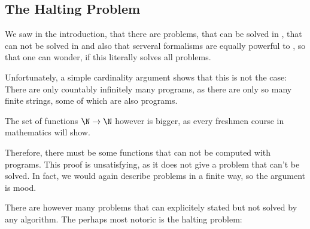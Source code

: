\subsection{The Halting Problem} \label{sec:halt}
We saw in the introduction, that there are problems, that can be solved in
\WHILE, that can not be solved in \FOR and also that serveral formalisms are
equally powerful to \WHILE, so that one can wonder, if this literally solves
all problems.

Unfortunately, a simple cardinality argument shows that this is not the case: 
There are only countably infinitely many \WHILE programs, as there are only 
so many finite strings, some of which are also \WHILE programs.

The set of functions $\N \rightarrow \N$ however is bigger, as every freshmen 
course in mathematics will show.

Therefore, there must be some functions that can not be computed with \WHILE 
programs. This proof is unsatisfying, as it does not give a problem that 
can't be solved. In fact, we would again describe problems in a finite way, 
so the argument is mood.

There are however many problems that can explicitely stated but not solved by 
any algorithm. The perhaps most notoric is the halting problem:

